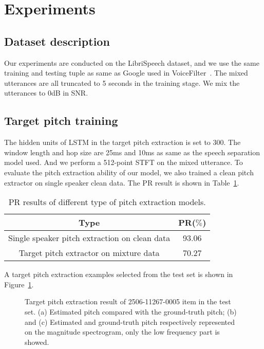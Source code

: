 

\section{Experiments}
\label{sec:exp_result}

\subsection{Dataset description}
\label{subsec:dataset}

Our experiments are conducted on the LibriSpeech dataset, and we use the same training and testing tuple as same as Google used in VoiceFilter~\cite{voicefilter}. The mixed utterances are all truncated to 5 seconds in the training stage. We mix the utterances to 0dB in SNR.

\subsection{Target pitch training}
\label{subsec:target_pitch_training}

The hidden units of LSTM in the target pitch extraction is set to 300. The window length and hop size are 25ms and 10ms as same as the speech separation model used. And we perform a 512-point STFT on the mixed utterance. To evaluate the pitch extraction ability of our model, we also trained a clean pitch extractor on single speaker clean data. The PR result is shown in Table~\ref{tab:pitch result}.

\begin{table}[htbp]
    \centering
    \begin{tabular}{c|c}
        \toprule
        Type                                          & PR($\%$) \\
        \midrule
        Single speaker pitch extraction on clean data & 93.06    \\
        \midrule
        Target pitch extractor on mixture data        & 70.27    \\
        \bottomrule
    \end{tabular}
    \caption{PR results of different type of pitch extraction models.}
    \label{tab:pitch result}
\end{table}

A target pitch extraction examples selected from the test set is shown in Figure~\ref{fig:pitch_1}.
\begin{figure}[!htbp]
    \centering

    \caption{Target pitch extraction result of 2506-11267-0005 item in the test set. (a) Estimated pitch compared with the ground-truth pitch; (b) and (c) Estimated and ground-truth pitch respectively represented on the magnitude spectrogram, only the low frequency part is showed. }
    \label{fig:pitch_1}
\end{figure}


